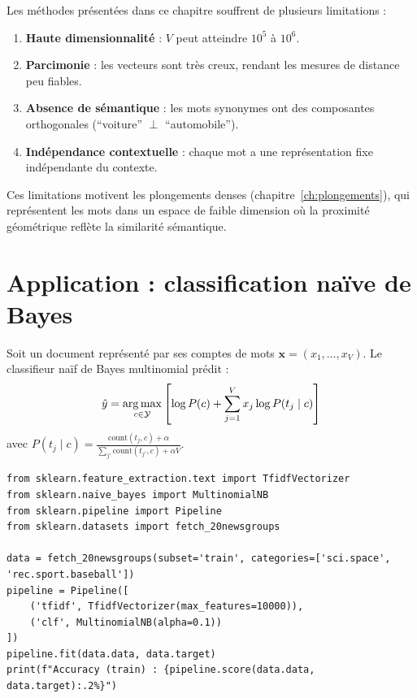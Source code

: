 Les m\'ethodes pr\'esent\'ees dans ce chapitre souffrent de plusieurs limitations :

\begin{enumerate}
    \item \textbf{Haute dimensionnalit\'e} : $V$ peut atteindre $10^5$ \`a $10^6$.
    \item \textbf{Parcimonie} : les vecteurs sont tr\`es creux, rendant les
          mesures de distance peu fiables.
    \item \textbf{Absence de s\'emantique} : les mots synonymes ont des
          composantes orthogonales (``voiture'' $\perp$ ``automobile'').
    \item \textbf{Ind\'ependance contextuelle} : chaque mot a une repr\'esentation
          fixe ind\'ependante du contexte.
\end{enumerate}

Ces limitations motivent les plongements denses (chapitre~\ref{ch:plongements}),
qui repr\'esentent les mots dans un espace de faible dimension o\`u la proximit\'e
g\'eom\'etrique refl\`ete la similarit\'e s\'emantique.

\section{Application : classification na\"ive de Bayes}
\label{sec:rep:naivebayes}

\begin{definition}
Soit un document repr\'esent\'e par ses comptes de mots $\mathbf{x} = (x_1, \ldots, x_V)$.
Le classifieur na\"if de Bayes multinomial pr\'edit :
\[
\hat{y} = \operatorname*{arg\,max}_{c \in \mathcal{Y}} \left[\log P(c) + \sum_{j=1}^{V} x_j \log P(t_j \mid c)\right]
\]
avec $P(t_j \mid c) = \frac{\text{count}(t_j, c) + \alpha}{\sum_{j'} \text{count}(t_{j'}, c) + \alpha V}$.
\end{definition}

\begin{codeblock}[title=\textbf{Classification na\"ive de Bayes}]
\begin{verbatim}
from sklearn.feature_extraction.text import TfidfVectorizer
from sklearn.naive_bayes import MultinomialNB
from sklearn.pipeline import Pipeline
from sklearn.datasets import fetch_20newsgroups

data = fetch_20newsgroups(subset='train', categories=['sci.space', 'rec.sport.baseball'])
pipeline = Pipeline([
    ('tfidf', TfidfVectorizer(max_features=10000)),
    ('clf', MultinomialNB(alpha=0.1))
])
pipeline.fit(data.data, data.target)
print(f"Accuracy (train) : {pipeline.score(data.data, data.target):.2%}")
\end{verbatim}
\end{codeblock}

